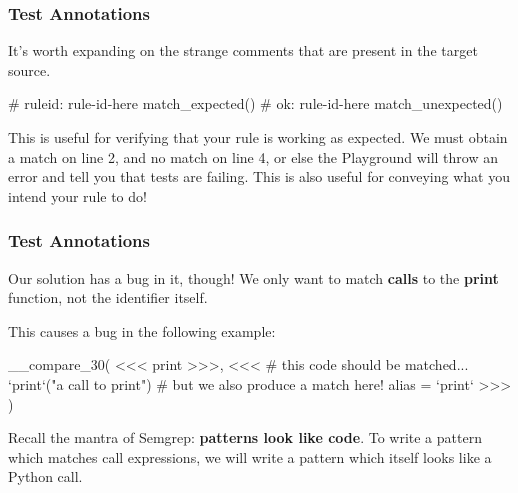 \documentclass[aspectratio=169, handout]{beamer}
\begin{document}
\begin{frame}[fragile]
  \frametitle{Test Annotations}

  It's worth expanding on the strange comments that are present in the target source.

  \pause
  \vspace{\fill}


  \vspace{\fill}

  \begin{pythoncodeblock}
    # ruleid: rule-id-here
    match_expected()
    # ok: rule-id-here
    match_unexpected()
  \end{pythoncodeblock}

  \pause
  \vspace{\fill}

  This is useful for verifying that your rule is working as expected. We must
  obtain a match on line 2, and no match on line 4, or else the Playground will throw
  an error and tell you that tests are failing. This is also useful for conveying
  what you intend your rule to do!
\end{frame}

\begin{frame}[fragile]
  \frametitle{Test Annotations}

  Our solution has a bug in it, though! We only want to match \textbf{calls} to the
  \textbf{print} function, not the identifier  itself.

  \pause
  \vspace{5pt}

  This causes a bug in the following example:

  \vspace{\fill}

__compare_30(
<<<
  print
>>>,
<<<
  # this code should be matched...
  `print`("a call to print")
  # but we also produce a match here!
  alias = `print`
>>>
)

  \pause
  \vspace{\fill}

  Recall the mantra of Semgrep: \textbf{patterns look like code}. To write a pattern
  which matches call expressions, we will write a pattern which itself looks like a
  Python call.
\end{frame}
\end{document}
